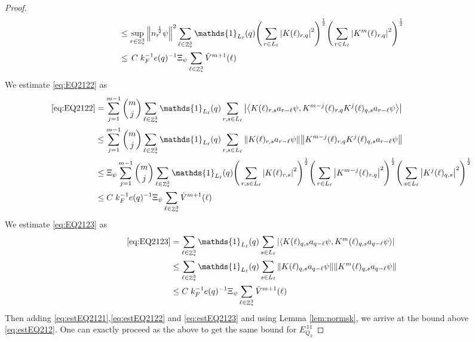 \documentclass[sn-mathphys, Numbered ,a4paper]{sn-jnl}%
\DeclareMathOperator{\Z}{\mathbb{Z}}
\newcommand{\half}{\frac{1}{2}}
\newcommand{\eva}[1]{\left\langle #1 \right\rangle}
\theoremstyle{plain}
\theoremstyle{definition}
\theoremstyle{remark}
\theoremstyle{plain}
\theoremstyle{definition}
\theoremstyle{remark}
\begin{document}
\begin{proof}
\begin{align}
		&\leq \sup\limits_{r\in \Z^3_*} \norm{n_r^{\,\half}\psi}^2 \sum\limits_{\ell \in \Z^3_*} \mathds{1}_{L_{\ell}}(q) \Bigg(\sum\limits_{r\in L_{\ell}} \abs{ K(\ell)_{r,q} }^2\Bigg)^\half \Bigg(\sum\limits_{r\in L_{\ell}}\abs{ K^m(\ell)_{r,q} }^2\Bigg)^\half\nonumber\\
		&\leq \, C\; k_F^{-1}e(q)^{-1}\Xi_{\psi} \sum\limits_{\ell \in \Z^3_*}\hat{V}^{m+1}(\ell) \label{eq:estEQ2121}
	\end{align}
	We estimate \eqref{eq:EQ2122} as
	\begin{align}
		\eqref{eq:EQ2122}
		&=\sum\limits_{j=1}^{m-1} {{m}\choose j} \sum\limits_{\ell \in \Z^3_*}\mathds{1}_{L_{\ell}}(q) \sum\limits_{r,s\in L_{\ell}}  \abs{\eva{ K(\ell)_{r,s} a_{r-\ell}\psi, K^{m-j}(\ell)_{r,q} K^{j}(\ell)_{q,s} a_{r-\ell} \psi }}\nonumber\\
		&\leq \sum\limits_{j=1}^{m-1} {{m}\choose j} \sum\limits_{\ell \in \Z^3_*}\mathds{1}_{L_{\ell}}(q) \sum\limits_{r,s\in L_{\ell}}  \norm{ K(\ell)_{r,s} a_{r-\ell}\psi}\norm{ K^{m-j}(\ell)_{r,q} K^{j}(\ell)_{q,s} a_{r-\ell} \psi } \nonumber\\
		&\leq \Xi_{\psi}\sum\limits_{j=1}^{m-1} {{m}\choose j} \sum\limits_{\ell \in \Z^3_*}\mathds{1}_{L_{\ell}}(q) \Bigg(\sum\limits_{r,s\in L_{\ell}}  \abs{ K(\ell)_{r,s} }^2\Bigg)^{\half} \Bigg(\sum\limits_{r\in L_{\ell}} \abs{ K^{m-j}(\ell)_{r,q}}^2\Bigg)^{\half}\Bigg(\sum\limits_{s\in L_{\ell}} \abs{ K^{j}(\ell)_{q,s} }^{2}\Bigg)^{\half} \nonumber\\
		&\leq C\; k_F^{-1}e(q)^{-1} \Xi_{\psi}\sum\limits_{\ell \in \Z^3_*} \hat{V}^{m+1}(\ell) \label{eq:estEQ2122}
	\end{align}
	We estimate \eqref{eq:EQ2123} as 
	\begin{align}
		\eqref{eq:EQ2123}
		&=\sum\limits_{\ell \in \Z^3_*} \mathds{1}_{L_{\ell}}(q) \sum\limits_{ s \in L_{\ell}} \abs{\eva{K(\ell)_{q,s} a_{q-\ell} \psi, K^m(\ell)_{q,s}  a_{q-\ell} \psi }} \nonumber\\
		&\leq \sum\limits_{\ell \in \Z^3_*} \mathds{1}_{L_{\ell}}(q) \sum\limits_{ s \in L_{\ell}} \norm{K(\ell)_{q,s} a_{q-\ell} \psi}\norm{ K^m(\ell)_{q,s}  a_{q-\ell} \psi } \nonumber\\
		&\leq C\; k_F^{-1}e(q)^{-1} \Xi_{\psi}\sum\limits_{\ell \in \Z^3_*} \hat{V}^{m+1}(\ell) \label{eq:estEQ2123}
	\end{align} 
	Then adding \eqref{eq:estEQ2121},\eqref{eq:estEQ2122} and \eqref{eq:estEQ2123} and using Lemma \ref{lem:normsk}, we arrive at the bound above \eqref{eq:estEQ212}. One can exactly proceed as the above to get the same bound for $E_{Q_2}^{\,11}$
\end{proof}
\end{document}
